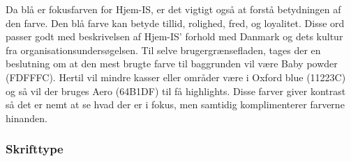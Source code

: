 Da blå er fokusfarven for Hjem-IS, er det vigtigt også at forstå betydningen af den farve. Den blå farve kan betyde tillid, rolighed, fred, og loyalitet. Disse ord passer godt med beskrivelsen af Hjem-IS' forhold med Danmark og dets kultur fra organisationsundersøgelsen. Til selve brugergrænsefladen, tages der en beslutning om at den mest brugte farve til baggrunden vil være Baby powder (FDFFFC). Hertil vil mindre kasser eller områder være i Oxford blue (11223C) og så vil der bruges Aero (64B1DF) til få highlights. Disse farver giver kontrast så det er nemt at se hvad der er i fokus, men samtidig komplimenterer farverne hinanden.

\subsubsection{Skrifttype}
